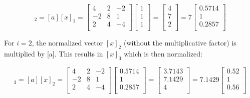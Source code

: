 \documentclass{article}
\begin{document}
\begin{equation*}
[x]_2 = [a][x]_1 =
\begin{bmatrix}
4 & 2 & -2 \\
-2 & 8 & 1 \\
2 & 4 & -4 \\
\end{bmatrix}
\begin{bmatrix}
1 \\
1 \\
1 \\
\end{bmatrix}
=
\begin{bmatrix}
4 \\
7\\
2 \\
\end{bmatrix}
= 7
\begin{bmatrix}
0.5714 \\
1\\
0.2857 \\
\end{bmatrix}
\end{equation*}


For $i = 2$, the normalized vector $[x]_2$ (without the multiplicative factor) is multiplied by [a]. This results in $[x]_3$ which is then normalized:

\begin{equation*}
[x]_3 = [a][x]_2 =
\begin{bmatrix}
4 & 2 & -2 \\
-2 & 8 & 1 \\
2 & 4 & -4 \\
\end{bmatrix}
\begin{bmatrix}
0.5714 \\
1 \\
0.2857 \\
\end{bmatrix}
=
\begin{bmatrix}
3.7143 \\
7.1429 \\
4 \\
\end{bmatrix}
= 7.1429
\begin{bmatrix}
0.52 \\
1\\
0.56 \\
\end{bmatrix}
\end{equation*}
\end{document}
